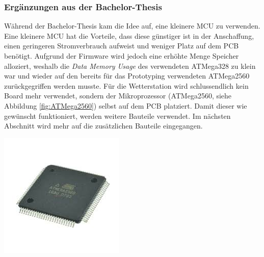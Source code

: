 \subsubsection{Ergänzungen aus der Bachelor-Thesis}
{\begin{minipage}[b][220pt][t]{0.55\textwidth}
Während der Bachelor-Thesis kam die Idee auf, eine kleinere MCU zu verwenden. Eine kleinere MCU hat die Vorteile, dass diese günstiger ist in der Anschaffung, einen geringeren Stromverbrauch aufweist und weniger Platz auf dem PCB benötigt.  Aufgrund der Firmware wird jedoch eine erhöhte Menge Speicher alloziert, weshalb die \textit{Data Memory Usage} des verwendeten ATMega328 zu klein war und wieder auf den bereits für das Prototyping verwendeten ATMega2560 zurückgegriffen werden musste. Für die Wetterstation wird schlussendlich kein Board mehr verwendet, sondern der Mikroprozessor (ATMega2560, siehe Abbildung \ref{fig:ATMega2560}) selbst auf dem PCB platziert. Damit dieser wie gewünscht funktioniert, werden weitere Bauteile verwendet. Im nächsten Abschnitt wird mehr auf die zusätzlichen Bauteile eingegangen.
\end{minipage}}
{\begin{minipage}[b][220pt][t]{0.44\textwidth}
\centering
\includegraphics[width=0.8\linewidth]{graphics/MCU/ATMega2560.jpg}
\label{fig:ATMega2560}
\end{minipage}}

